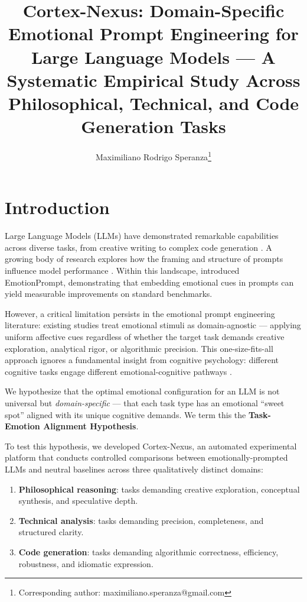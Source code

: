 \documentclass[lineno]{wlpeerj}
\title{Cortex-Nexus: Domain-Specific Emotional Prompt Engineering for Large Language Models --- A Systematic Empirical Study Across Philosophical, Technical, and Code Generation Tasks}
\author[1]{Maximiliano Rodrigo Speranza\thanks{Corresponding author: maximiliano.speranza@gmail.com}}
\affil[1]{Independent Researcher, Buenos Aires, Argentina}
\begin{document}
\flushbottom
\maketitle
\thispagestyle{empty}

\section{Introduction}

Large Language Models (LLMs) have demonstrated remarkable capabilities across diverse tasks, from creative writing to complex code generation \citep{brown2020language, chen2021evaluating}. A growing body of research explores how the framing and structure of prompts influence model performance \citep{wei2022chain, sahoo2024systematic, white2023prompt}. Within this landscape, \citet{coda2023emotionprompt} introduced EmotionPrompt, demonstrating that embedding emotional cues in prompts can yield measurable improvements on standard benchmarks.

However, a critical limitation persists in the emotional prompt engineering literature: existing studies treat emotional stimuli as domain-agnostic --- applying uniform affective cues regardless of whether the target task demands creative exploration, analytical rigor, or algorithmic precision. This one-size-fits-all approach ignores a fundamental insight from cognitive psychology: different cognitive tasks engage different emotional-cognitive pathways \citep{kahneman2011thinking}.

We hypothesize that the optimal emotional configuration for an LLM is not universal but \textit{domain-specific} --- that each task type has an emotional ``sweet spot'' aligned with its unique cognitive demands. We term this the \textbf{Task-Emotion Alignment Hypothesis}.

To test this hypothesis, we developed Cortex-Nexus, an automated experimental platform that conducts controlled comparisons between emotionally-prompted LLMs and neutral baselines across three qualitatively distinct domains:

\begin{enumerate}
    \item \textbf{Philosophical reasoning}: tasks demanding creative exploration, conceptual synthesis, and speculative depth.
    \item \textbf{Technical analysis}: tasks demanding precision, completeness, and structured clarity.
    \item \textbf{Code generation}: tasks demanding algorithmic correctness, efficiency, robustness, and idiomatic expression.
\end{enumerate}
\end{document}
